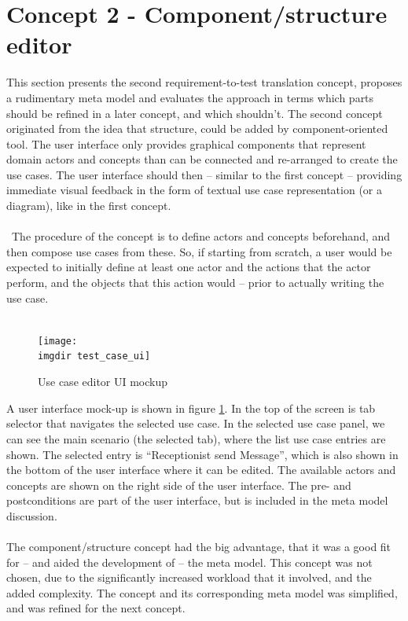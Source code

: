 \section{Concept 2 - Component/structure editor}
This section presents the second requirement-to-test translation concept, proposes a rudimentary meta model and evaluates the approach in terms which parts should be refined in a later concept, and which shouldn't.
The second concept originated from the idea that structure, could be added by component-oriented tool. The user interface only provides graphical components that represent domain actors and concepts than can be connected and re-arranged to create the use cases. The user interface should then -- similar to the first concept -- providing immediate visual feedback in the form of textual use case representation (or a diagram), like in the first concept.\\\\\
The procedure of the concept is to define actors and concepts beforehand, and then compose use cases from these. So, if starting from scratch, a user would be expected to initially define at least one actor and the actions that the actor perform, and the objects that this action would -- prior to actually writing the use case.\\\\
\begin{figure}[!htbp]
\texttt{[image: \\imgdir test\_case\_ui]}
\centering
\caption{Use case editor UI mockup}
\label{fig:use_case_editor_mockup}
\end{figure}A user interface mock-up is shown in figure \ref{fig:use_case_editor_mockup}. In the top of the screen is tab selector that navigates the selected use case. In the selected use case panel, we can see the main scenario (the selected tab), where the list use case entries are shown. The selected entry is ``Receptionist send Message'', which is also shown in the bottom of the user interface where it can be edited. The available actors and concepts are shown on the right side of the user interface. The pre- and postconditions are part of the user interface, but is included in the meta model discussion.\\\\
The component/structure concept had the big advantage, that it was a good fit for -- and aided the development of -- the meta model. This concept was not chosen, due to the significantly increased workload that it involved, and the added complexity. The concept and its corresponding meta model was simplified, and was refined for the next concept.

